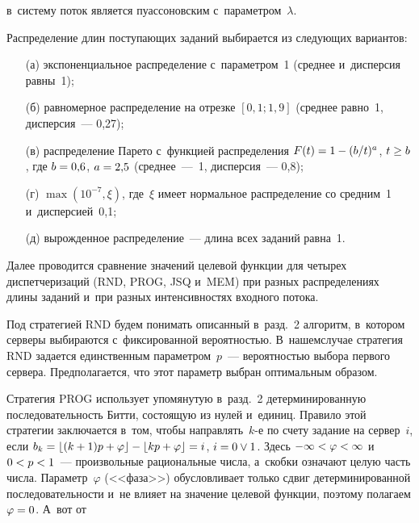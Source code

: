 \begin{multicols}{2}
\pagebreak

\noindent
 в~систему поток 
является пуассоновским с~па\-ра\-мет\-ром~$\lambda$.
    
    Распределение длин поступающих заданий выбирается из следующих вариантов:
    \begin{itemize}
     \item[(а)] экспоненциальное распределение с~па\-ра\-мет\-ром~1 (среднее и~дисперсия 
равны~1);
     \item[(б)] равномерное распределение на отрезке $[0{,}1; 1{,}9]$ (среднее равно~1, 
дисперсия~--- 0,27);
     \item[(в)] распределение Парето с~функцией распределения $F(t)\hm= 1\hm- (b/t)^a$, 
$t\hm\geq b$, где $b\hm= 0{,}6$, $a\hm= 2{,}5$ (среднее~---~1, дисперсия~--- 0,8);
     \item[(г)] $\max(10^{-7},\xi)$, где~$\xi$ имеет нормальное распределение со 
средним~1 и~дисперсией~0,1;
     \item[(д)] вырожденное распределение~--- длина всех заданий равна~1.
     \end{itemize}
    
    Далее проводится сравнение значений целевой функции для четырех диспетчеризаций 
(RND, PROG, JSQ и~MEM) при разных распределениях длины заданий и~при разных 
интенсивностях входного потока.
    
    Под стратегией RND будем понимать описанный в~разд.~2 алгоритм, в~котором 
серверы выбираются с~фиксированной вероятностью. В~нашем\linebreak случае стратегия RND 
задается единственным параметром~$p$~--- вероятностью выбора первого сервера. 
Предполагается, что этот параметр выбран оптимальным образом.
    
    Стратегия PROG использует упомянутую в~разд.~2 детерминированную 
последовательность Битти, состоящую из нулей и~единиц. Правило этой стратегии 
заключается в~том, чтобы направлять~\mbox{$k$-е} по счету задание на сервер~$i$, если $b_k\hm= 
\lfloor (k\hm+1)p \hm+ \varphi\rfloor \hm- \lfloor kp\hm+\varphi\rfloor \hm= i$, $i\hm= 0\vee 1$. 
Здесь $-\infty \hm< \varphi\hm < \infty$ и~$0\hm< p\hm<1$~--- произвольные рациональные 
числа, а~скобки означают целую часть числа. Параметр~$\varphi$ (<<фаза>>) 
обусловливает только сдвиг детерминированной последовательности и~не влияет на 
значение целевой функции, поэтому полагаем $\varphi\hm=0$. А~вот от\linebreak\vspace*{-12pt}


\end{multicols}
